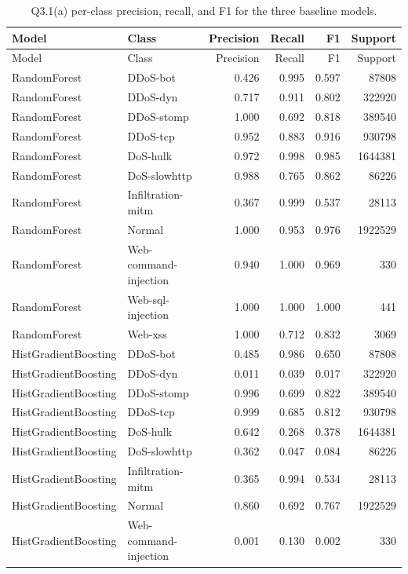 \documentclass[journal,onecolumn]{IEEEtran}
\begin{document}
\begingroup
\scriptsize
\begin{longtable}{@{}llrrrr@{}}
\caption{Q3.1(a) per-class precision, recall, and F1 for the three baseline models.}
\label{tab:q3_baseline_perclass}\\
\toprule
Model & Class & Precision & Recall & F1 & Support \\
\midrule
\endfirsthead
\toprule
Model & Class & Precision & Recall & F1 & Support \\
\midrule
\endhead
RandomForest & DDoS-bot & 0.426 & 0.995 & 0.597 & 87808 \\
RandomForest & DDoS-dyn & 0.717 & 0.911 & 0.802 & 322920 \\
RandomForest & DDoS-stomp & 1.000 & 0.692 & 0.818 & 389540 \\
RandomForest & DDoS-tcp & 0.952 & 0.883 & 0.916 & 930798 \\
RandomForest & DoS-hulk & 0.972 & 0.998 & 0.985 & 1644381 \\
RandomForest & DoS-slowhttp & 0.988 & 0.765 & 0.862 & 86226 \\
RandomForest & Infiltration-mitm & 0.367 & 0.999 & 0.537 & 28113 \\
RandomForest & Normal & 1.000 & 0.953 & 0.976 & 1922529 \\
RandomForest & Web-command-injection & 0.940 & 1.000 & 0.969 & 330 \\
RandomForest & Web-sql-injection & 1.000 & 1.000 & 1.000 & 441 \\
RandomForest & Web-xss & 1.000 & 0.712 & 0.832 & 3069 \\
HistGradientBoosting & DDoS-bot & 0.485 & 0.986 & 0.650 & 87808 \\
HistGradientBoosting & DDoS-dyn & 0.011 & 0.039 & 0.017 & 322920 \\
HistGradientBoosting & DDoS-stomp & 0.996 & 0.699 & 0.822 & 389540 \\
HistGradientBoosting & DDoS-tcp & 0.999 & 0.685 & 0.812 & 930798 \\
HistGradientBoosting & DoS-hulk & 0.642 & 0.268 & 0.378 & 1644381 \\
HistGradientBoosting & DoS-slowhttp & 0.362 & 0.047 & 0.084 & 86226 \\
HistGradientBoosting & Infiltration-mitm & 0.365 & 0.994 & 0.534 & 28113 \\
HistGradientBoosting & Normal & 0.860 & 0.692 & 0.767 & 1922529 \\
HistGradientBoosting & Web-command-injection & 0.001 & 0.130 & 0.002 & 330 \\

\end{longtable}
\end{document}
